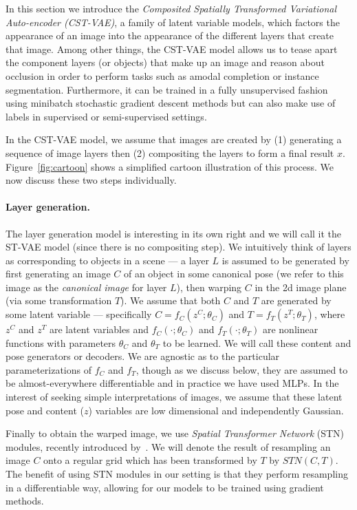 In this section we introduce the \emph{Composited Spatially Transformed Variational Auto-encoder  (CST-VAE)},
a family of latent variable models, which factors
the appearance of an image into the appearance of the different layers
that create that image.  
Among other things, the CST-VAE model allows us to tease
apart the component layers (or objects) that make up an image and reason about occlusion in order to perform tasks such as amodal completion or instance segmentation.
Furthermore, it can be trained in a fully unsupervised fashion using  minibatch stochastic
gradient descent methods but can also make use of labels in supervised or semi-supervised settings.
 
 In the CST-VAE model, we assume that images are created by (1) generating a sequence of image layers 
 then (2) compositing the layers to form a final result $x$.  Figure~\ref{fig:cartoon} shows a simplified cartoon illustration of this process.  
 We now discuss these two steps individually.
 \vspace{-1mm}
 \paragraph{Layer generation.}
 The layer generation model is interesting in its own right and we will call it the ST-VAE model (since there is no compositing step).
 We intuitively think of  layers as corresponding to objects in a scene --- a layer $L$ is assumed 
 to be generated by first generating an image $C$ of an object in some canonical pose (we refer to this image as
 the \emph{canonical image} for layer $L$), then warping $C$ in the 2d image plane (via some transformation $T$).
We assume that both $C$ and $T$ are generated by some latent variable --- specifically $C = f_C(z^C; \theta_C)$ and $T = f_T(z^T; \theta_T)$,
where $z^C$ and $z^T$ are latent variables and $f_C(\cdot; \theta_C)$ and $f_T(\cdot; \theta_T)$ are nonlinear functions with parameters
$\theta_C$ and $\theta_T$ to be learned.  We will call these content
and pose generators or decoders.
We are agnostic as to the particular parameterizations of $f_C$ and $f_T$, though as we discuss below, they
are assumed to be almost-everywhere differentiable and in practice we
have used MLPs.
In the interest of seeking simple interpretations of images, we assume that these latent pose and content ($z$) variables are low 
dimensional and independently Gaussian.

Finally to obtain the warped image, we
use \emph{Spatial Transformer Network} (STN) modules, recently introduced by~\cite{jaderberg2015spatial}.
We will denote  the result of resampling an image $C$ onto a regular grid which has been transformed by $T$ by $STN(C, T)$.
The benefit of using STN modules in our setting 
is that they perform resampling in a differentiable way, allowing for our models to be trained using gradient methods.
 \vspace{-1mm}
